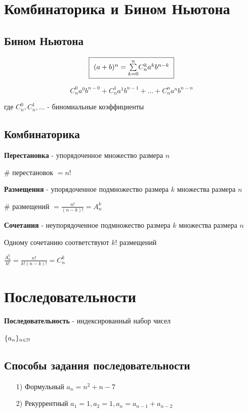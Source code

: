 \section{Комбинаторика и Бином Ньютона}
\subsection{Бином Ньютона}

$$ \fbox{
    $ (a + b)^n = \Sum{k = 0}{n} C^k_n a^k b^{n-k} $
} $$

$$ C^0_n a^0 b^{n - 0} + C^1_n a^1 b^{n - 1} + \ldots + C^n_n a^n b^{n - n} $$

где $C^0_n, C^1_n, \ldots $ - биномиальные коэффициенты

\subsection{Комбинаторика}

\begin{definition}
    \textbf{Перестановка} - упорядоченное множество размера $n$ 

    \# перестановок $= n!$
\end{definition}

\begin{definition}
    \textbf{Размещения} - упорядоченное подмножество размера $k$ множества размера $n$

    \# размещений $= \frac{n!}{(n - k)!} = A^k_n$
\end{definition}

\begin{definition}
    \textbf{Сочетания} - неупорядоченное подмножество размера $k$ множества размера $n$

    Одному сочетанию соответствуют $k!$ размещений

    $ \frac{A^k_n}{k!} = \frac{n!}{k!(n-k)!} = C^k_n $
\end{definition}

\section{Последовательности}

\begin{definition}
    \textbf{Последовательность} - индексированный набор чисел

    $ \{a_n\}_{n \in \N} $
\end{definition}

\subsection{Способы задания последовательности}
\begin{itemize}
    \item[1)] Формульный $a_n = n^2 + n - 7$
    \item[2)] Рекуррентный $a_1 = 1, a_2 = 1, a_n = a_{n-1} + a_{n-2} $
\end{itemize}

